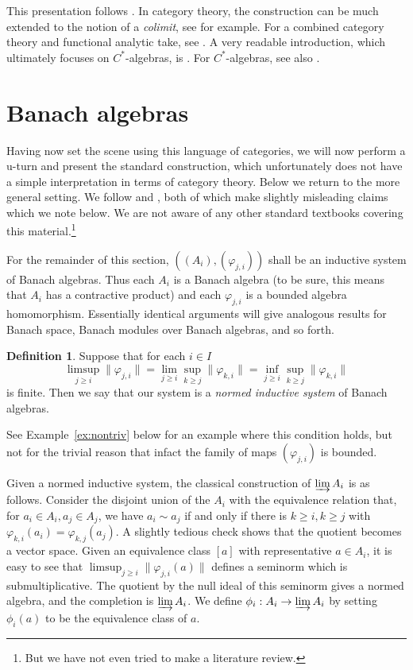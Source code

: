\documentclass[a4paper,11pt]{article}
\newcommand{\indlim}{\varinjlim}
\theoremstyle{definition}
\newtheorem{definition}[lemma]{Definition}
\begin{document}
This presentation follows \cite[Section~6.2]{rll}.  In category theory, the construction can be
much extended to the notion of a \emph{colimit}, see \cite[Chapter~5]{leinster} for example.  For
a combined category theory and functional analytic take, see \cite{cas}.
A very readable introduction, which ultimately focuses on $C^*$-algebras, is \cite[Appendix~L]{wo}.
For $C^*$-algebras, see also \cite[Section~II.8.2]{blenc}.


\section{Banach algebras}\label{sec:ba}

Having now set the scene using this language of categories, we will now perform a u-turn and present
the standard construction, which unfortunately does not have a simple interpretation in terms of
category theory.  Below we return to the more general setting.  We follow
\cite[Definition~1.3.4]{palmer} and \cite[Section~3.3]{blackadar}, both of which make slightly
misleading claims which we note below.  We are not aware of any other standard textbooks covering
this material.\footnote{But we have not even tried to make a literature review.}

For the remainder of this section, $((A_i), (\varphi_{j,i}))$ shall be an inductive system of Banach
algebras.  Thus each $A_i$ is a Banach algebra (to be sure, this means that $A_i$ has a contractive
product) and each $\varphi_{j,i}$ is a bounded algebra homomorphism.  Essentially identical
arguments will give analogous results for Banach space, Banach modules over Banach algebras, and so
forth.

\begin{definition}\label{defn:1}
Suppose that for each $i\in I$
\begin{equation}\label{eq:1}
\limsup_{j\geq i} \|\varphi_{j,i}\| = \lim_{j\geq i} \sup_{k\geq j} \|\varphi_{k,i}\|
=
\inf_{j\geq i} \sup_{k\geq j} \|\varphi_{k,i}\|
\end{equation}
is finite.  Then we say that our system is a \emph{normed inductive system} of Banach algebras.
\end{definition}

See Example~\ref{ex:nontriv} below for an example where this condition holds, but not for the trivial reason that infact the family of maps $(\varphi_{j,i})$ is bounded.

Given a normed inductive system, the classical construction of $\indlim A_i$ is as follows.
Consider the disjoint union of the $A_i$ with the equivalence relation that, for $a_i\in A_i,
a_j\in A_j$, we have $a_i \sim a_j$ if and only if there is $k\geq i, k\geq j$ with
$\varphi_{k,i}(a_i) = \varphi_{k,j}(a_j)$.  A slightly tedious check shows that the quotient becomes
a vector space.  Given an equivalence class $[a]$ with representative $a\in A_i$, it is easy to see
that $\limsup_{j\geq i} \|\varphi_{j,i}(a)\|$ defines a seminorm which is submultiplicative.
The quotient by the null ideal of this seminorm gives a normed algebra, and the completion is
$\indlim A_i$.  We define $\phi_i:A_i \rightarrow \indlim A_i$ by setting $\phi_i(a)$ to
be the equivalence class of $a$.
\end{document}
